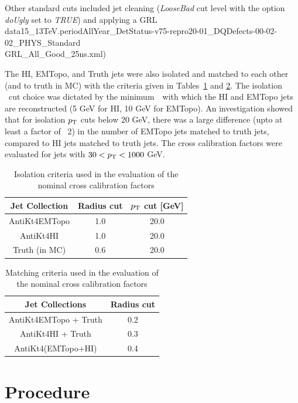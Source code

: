 Other standard cuts included jet cleaning ({\it{LooseBad}} cut level with the option {\it{doUgly}} set to {\it TRUE}) and applying a GRL data15\_13TeV.periodAllYear\_DetStatus-v75-repro20-01\_DQDefects-00-02-02\_PHYS\_Standard\\GRL\_All\_Good\_25ns.xml)

The HI, EMTopo, and Truth jets were also isolated and matched to each other (and to truth in MC) with the criteria given in Tables~\ref{table:iso_criteria} and \ref{table:match_criteria}. The isolation \pt\ cut choice was dictated by the minimum\ \pT \ with which the HI and EMTopo jets are reconstructed (5 GeV for HI, 10 GeV for EMTopo). An investigation showed that for isolation $\mbox{$p_{\mathrm{T}}$}$ cuts below 20 GeV, there was a large difference (upto at least a factor of ~2) in the number of EMTopo jets matched to truth jets, compared to HI jets matched to truth jets. The cross calibration factors were evaluated for jets with $30 < \mbox{$p_{\mathrm{T}}$} < 1000 $ GeV.

\begin{table}[ht]
\caption{Isolation criteria used in the evaluation of the nominal cross calibration factors}
\centering
\begin{tabular}{c c c}
\hline\hline
Jet Collection & Radius cut & $\mbox{$p_{\mathrm{T}}$}$ cut [GeV] \\ [0.5ex] %
\hline
AntiKt4EMTopo & 1.0 & 20.0 \\ 
AntiKt4HI & 1.0 & 20.0 \\ 
Truth (in MC) & 0.6 & 20.0 \\ 
\hline
\end{tabular}
\label{table:iso_criteria}
\end{table}

\begin{table}[ht]
\caption{Matching criteria used in the evaluation of the nominal cross calibration factors}
\centering
\begin{tabular}{c c}
\hline\hline
Jet Collections & Radius cut \\ [0.5ex] %
\hline
AntiKt4EMTopo + Truth & 0.2 \\ 
AntiKt4HI + Truth & 0.3 \\ 
AntiKt4(EMTopo+HI) & 0.4\\ 
\hline
\end{tabular}
\label{table:match_criteria}
\end{table}


\section{Procedure}
\label{sec:qual_procedure}

